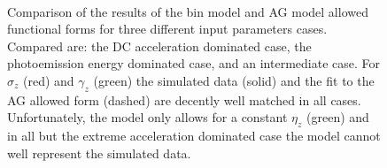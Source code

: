 \begin{figure}
  \centerline {
    \subfloat[][]{
      \label{fig:bin_model_acc}
      \begin{tikzpicture}
        
      \end{tikzpicture}
    }
    \subfloat[][]{
      \label{fig:bin_model_vmax}
      \begin{tikzpicture}
        
      \end{tikzpicture}
    }
    \\
  }
  \centerline{
    \subfloat[][]{
      \label{fig:bin_model_equal}
      \begin{tikzpicture}
        
      \end{tikzpicture}
    }
  }
  \caption[Results of bin model for computing initial conditions]{
    Comparison of the results of the bin model and AG model allowed functional forms for three different input parameters cases.
    Compared are:  the DC acceleration dominated case,  the photoemission energy dominated case, and  an intermediate case.
    For $\sigma_z$ (red) and $\gamma_z$ (green) the simulated data (solid) and the fit to the AG allowed form (dashed) are decently well matched in all cases.
    Unfortunately, the model only allows for a constant $\eta_z$ (green) and in all but the extreme acceleration dominated case  the model cannot well represent the simulated data.
  }
  \label{fig:bin_model}
\end{figure}

